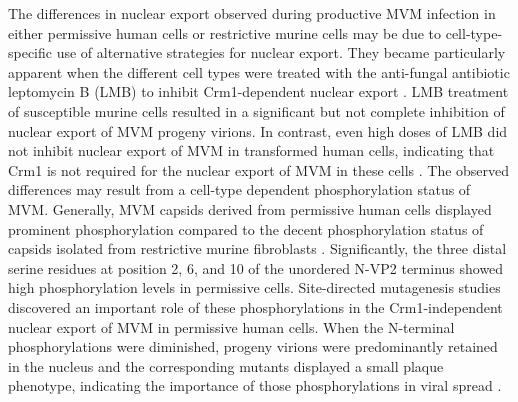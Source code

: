 The differences in nuclear export observed during productive MVM infection in either permissive human cells or restrictive murine cells may be due to cell-type-specific use of alternative strategies for nuclear export. They became particularly apparent when the different cell types were treated with the anti-fungal antibiotic leptomycin B (LMB) to inhibit Crm1-dependent nuclear export \cite{pmid9683540}. LMB treatment of susceptible murine cells resulted in a significant but not complete inhibition of nuclear export of MVM progeny virions. In contrast, even high doses of LMB did not inhibit nuclear export of MVM in transformed human cells, indicating that Crm1 is not required for the nuclear export of MVM in these cells \cite{pmid15367635}. The observed differences may result from a cell-type dependent phosphorylation status of MVM. Generally, MVM capsids derived from permissive human cells displayed prominent phosphorylation compared to the decent phosphorylation status of capsids isolated from restrictive murine fibroblasts \cite{pmid11069983}. Significantly, the three distal serine residues at position 2, 6, and 10 of the unordered N-VP2 terminus showed high phosphorylation levels in permissive cells. Site-directed mutagenesis studies discovered an important role of these phosphorylations in the Crm1-independent nuclear export of MVM in permissive human cells. When the N-terminal phosphorylations were diminished, progeny virions were predominantly retained in the nucleus and the corresponding mutants displayed a small plaque phenotype, indicating the importance of those phosphorylations in viral spread \cite{pmid15367635}. 

\clearpage
